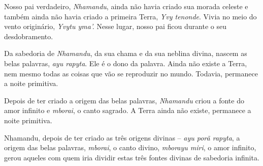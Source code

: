  

Nosso pai verdadeiro, \emph{Nhamandu}, ainda não havia criado sua morada
celeste e também ainda não havia criado a primeira Terra, \emph{Yvy
tenonde}. Vivia no meio do vento originário, \emph{Yvytu yma'.} Nesse
lugar, nosso pai ficou durante o seu desdobramento.

Da sabedoria de \emph{Nhamandu}, da sua chama e da sua neblina divina,
nascem as belas palavras, \emph{ayu rapyta}. Ele é o dono da palavra.
Ainda não existe a Terra, nem mesmo todas as coisas que vão se
reproduzir no mundo. Todavia, permanece a noite primitiva.

Depois de ter criado a origem das belas palavras, \emph{Nhamandu} criou
a fonte do amor infinito e \emph{mborai}, o canto sagrado. A Terra ainda
não existe, permanece a noite primitiva.

Nhamandu, depois de ter criado as três origens divinas -- \emph{ayu porã
rapyta}, a origem das belas palavras, \emph{mborai}, o canto divino,
\emph{mborayu miri}, o amor infinito, gerou aqueles com quem iria
dividir estas três fontes divinas de sabedoria infinita.
